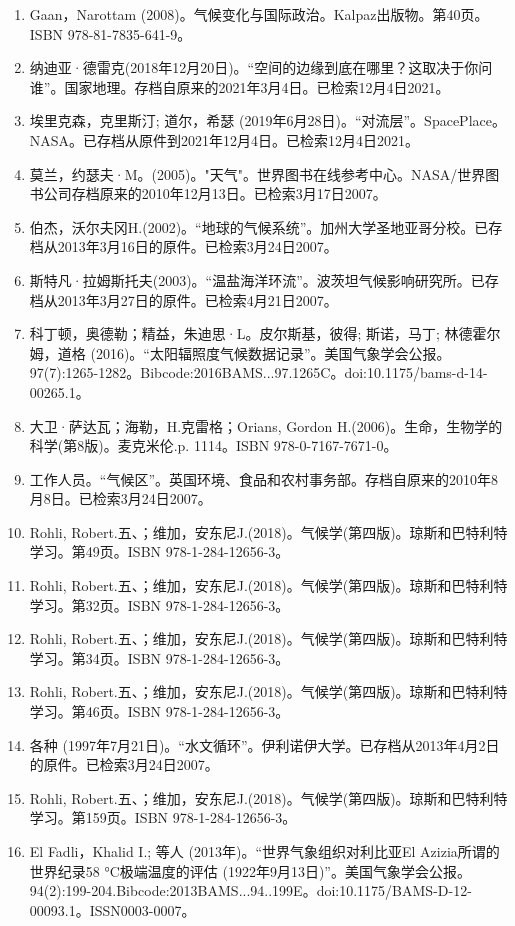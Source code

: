 \begin{enumerate}
\item Gaan，Narottam (2008)。气候变化与国际政治。Kalpaz出版物。第40页。ISBN 978-81-7835-641-9。
\item 纳迪亚·德雷克(2018年12月20日)。“空间的边缘到底在哪里？这取决于你问谁”。国家地理。存档自原来的2021年3月4日。已检索12月4日2021。
\item 埃里克森，克里斯汀; 道尔，希瑟 (2019年6月28日)。“对流层”。SpacePlace。NASA。已存档从原件到2021年12月4日。已检索12月4日2021。
\item 莫兰，约瑟夫·M。(2005)。"天气"。世界图书在线参考中心。NASA/世界图书公司存档原来的2010年12月13日。已检索3月17日2007。
\item 伯杰，沃尔夫冈H.(2002)。“地球的气候系统”。加州大学圣地亚哥分校。已存档从2013年3月16日的原件。已检索3月24日2007。
\item 斯特凡·拉姆斯托夫(2003)。“温盐海洋环流”。波茨坦气候影响研究所。已存档从2013年3月27日的原件。已检索4月21日2007。
\item 科丁顿，奥德勒；精益，朱迪思·L。皮尔斯基，彼得; 斯诺，马丁; 林德霍尔姆，道格 (2016)。“太阳辐照度气候数据记录”。美国气象学会公报。97(7):1265-1282。Bibcode:2016BAMS...97.1265C。doi:10.1175/bams-d-14-00265.1。
\item 大卫·萨达瓦；海勒，H.克雷格；Orians, Gordon H.(2006)。生命，生物学的科学(第8版)。麦克米伦.p. 1114。ISBN 978-0-7167-7671-0。
\item 工作人员。“气候区”。英国环境、食品和农村事务部。存档自原来的2010年8月8日。已检索3月24日2007。
\item Rohli, Robert.五、；维加，安东尼J.(2018)。气候学(第四版)。琼斯和巴特利特学习。第49页。ISBN 978-1-284-12656-3。
\item Rohli, Robert.五、；维加，安东尼J.(2018)。气候学(第四版)。琼斯和巴特利特学习。第32页。ISBN 978-1-284-12656-3。
\item Rohli, Robert.五、；维加，安东尼J.(2018)。气候学(第四版)。琼斯和巴特利特学习。第34页。ISBN 978-1-284-12656-3。
\item Rohli, Robert.五、；维加，安东尼J.(2018)。气候学(第四版)。琼斯和巴特利特学习。第46页。ISBN 978-1-284-12656-3。
\item 各种 (1997年7月21日)。“水文循环”。伊利诺伊大学。已存档从2013年4月2日的原件。已检索3月24日2007。
\item Rohli, Robert.五、；维加，安东尼J.(2018)。气候学(第四版)。琼斯和巴特利特学习。第159页。ISBN 978-1-284-12656-3。
\item El Fadli，Khalid I.; 等人 (2013年)。“世界气象组织对利比亚El Azizia所谓的世界纪录58 °C极端温度的评估 (1922年9月13日)”。美国气象学会公报。94(2):199-204.Bibcode:2013BAMS...94..199E。doi:10.1175/BAMS-D-12-00093.1。ISSN0003-0007。 

\end{enumerate}
